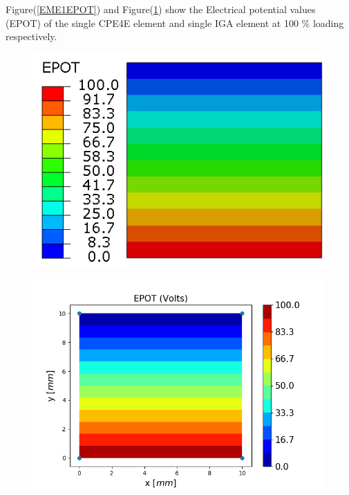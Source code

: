 \documentclass[12pt]{article}
\begin{document}
Figure(\ref{EME1EPOT}) and Figure(\ref{EME1EPOT_IGA}) show the Electrical potential values (EPOT) of the single CPE4E element and single IGA element at 100 \% loading respectively. \\
\begin{figure}[H]
	\centering
	\begin{minipage}{.5\textwidth}
		\centering
		\includegraphics[width=1\linewidth]{EME1EPOT.png}
		\label{EME1EPOT}
	\end{minipage}%
	\begin{minipage}{.6\textwidth}
		\centering
		\includegraphics[width=1\linewidth]{EME1EPOT_IGA.png}
		\label{EME1EPOT_IGA}
	\end{minipage}
\end{figure}
\end{document}
